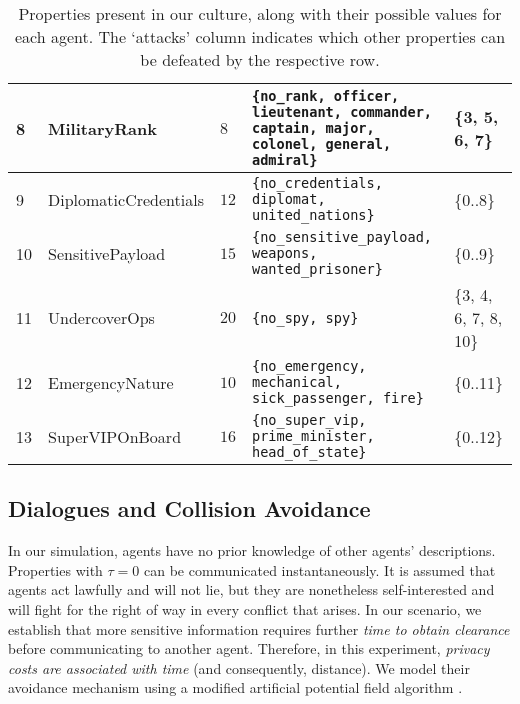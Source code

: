 \documentclass[acmsmall]{custom-arxiv}  %
\begin{document}
\begin{table}[]
\begin{tabularx}{\textwidth}{|l|l|l|X|l|}
8  & MilitaryRank          & $8$            & \texttt{\{no\_rank, officer, lieutenant, commander, captain, major, colonel, general, admiral\}} & \{3, 5, 6, 7\}        \\ \hline
9  & DiplomaticCredentials & $12$           & \texttt{\{no\_credentials, diplomat, united\_nations\}}                                          & \{0..8\}              \\ \hline
10 & SensitivePayload      & $15$           & \texttt{\{no\_sensitive\_payload, weapons, wanted\_prisoner\}}                                   & \{0..9\}              \\ \hline
11 & UndercoverOps         & $20$           & \texttt{\{no\_spy, spy\}}                                                                        & \{3, 4, 6, 7, 8, 10\} \\ \hline
12 & EmergencyNature       & $10$           & \texttt{\{no\_emergency, mechanical, sick\_passenger, fire\}}                                    & \{0..11\}             \\ \hline
13 & SuperVIPOnBoard       & $16$           & \texttt{\{no\_super\_vip, prime\_minister, head\_of\_state\}}                                    & \{0..12\}             \\ \hline
\end{tabularx}%
\caption{Properties present in our culture, along with their possible values for each agent. The `attacks' column indicates which other properties can be defeated by the respective row. }
\label{table:boat-culture}
\end{table}


\subsection{Dialogues and Collision Avoidance}

In our simulation, agents have no prior knowledge of other agents' descriptions. Properties with $\tau = 0$ can be communicated instantaneously. It is assumed that agents act lawfully and will not lie, but they are nonetheless self-interested and will fight for the right of way in every conflict that arises. In our scenario, we establish that more sensitive information requires further \textit{time to obtain clearance} before communicating to another agent. Therefore, in this experiment, \textit{privacy costs are associated with time} (and consequently, distance). We model their avoidance mechanism using a modified artificial potential field algorithm \citep{Warren1990MultipleFields}.
\end{document}
